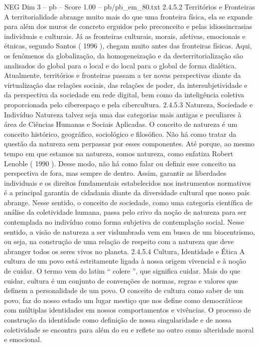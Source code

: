 \begin{textsample}{NEG Dim 3 – pb – Score 1.00 – pb/pb\_em\_80.txt}  \label{ex:f3_neg_205}
2.4.5.2 Territórios e Fronteiras A territorialidade abrange muito mais do que uma fronteira física, ela se expande para além dos muros de concreto erguidos pelo preconceito e pelas idiossincrasias individuais e culturais.
Já as fronteiras culturais, morais, afetivas, emocionais e étnicas, segundo Santos ( 1996 ), chegam muito antes das fronteiras físicas.
Aqui, os fenômenos da globalização, da homogeneização e da desterritorialização são analisados do global para o local e do local para o global de forma dialética.
Atualmente, territórios e fronteiras passam a ter novas perspectivas diante da virtualização das relações sociais, das relações de poder, da intersubjetividade e da perspectiva da sociedade em rede digital, bem como da inteligência coletiva proporcionada pelo ciberespaço e pela cibercultura. 2.4.5.3 Natureza, Sociedade e Indivíduo Natureza talvez seja uma das categorias mais antigas e peculiares à área de Ciências Humanas e Sociais Aplicadas.
O conceito de natureza é um conceito histórico, geográfico, sociológico e filosófico.
Não há como tratar da questão da natureza sem perpassar por esses componentes.
Até porque, ao mesmo tempo em que estamos na natureza, somos natureza, como enfatiza Robert Lenoble ( 1990 ).
Desse modo, não há como falar ou definir esse conceito na perspectiva de fora, mas sempre de dentro.
Assim, garantir as liberdades individuais e os direitos fundamentais estabelecidos nos instrumentos normativos é a principal garantia de cidadania diante da diversidade cultural que nosso país abrange.
Nesse sentido, o conceito de sociedade, como uma categoria científica de análise da coletividade humana, passa pelo crivo da noção de natureza para ser contemplada no indivíduo como forma subjetiva de contemplação social.
Nesse sentido, a visão de natureza a ser vislumbrada vem em busca de um biocentrismo, ou seja, na construção de uma relação de respeito com a natureza que deve abranger todos os seres vivos no planeta. 2.4.5.4 Cultura, Identidade e Ética A cultura de um povo está estritamente ligada à nossa origem vivencial e à noção de cuidar.
O termo vem do latim “ colere ”, que significa cuidar.
Mais do que cuidar, cultura é um conjunto de convenções de normas, regras e valores que definem a personalidade de um povo.
O conceito de cultura como saber de um povo, faz do nosso estado um lugar mestiço que nos define como democráticos com múltiplas identidades em nossos comportamentos e vivências.
O processo de construção da identidade como definição de nossa singularidade e de nossa coletividade se encontra para além do eu e reflete no outro como alteridade moral e emocional.

\end{textsample}
